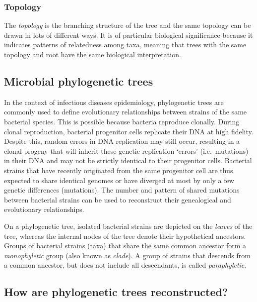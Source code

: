 \documentclass[11pt]{article}
\begin{document}
\hypertarget{topology}{%
\subsubsection{Topology}\label{topology}}

The \textit{topology} is the branching structure of the tree and the same
topology can be drawn in lots of different ways. It is of particular
biological significance because it indicates patterns of relatedness
among taxa, meaning that trees with the same topology and root have the
same biological interpretation.

    \hypertarget{microbial-phylogenetic-trees}{%
\subsection{Microbial phylogenetic
trees}\label{microbial-phylogenetic-trees}}

In the context of infectious diseases epidemiology, phylogenetic trees
are commonly used to define evolutionary relationships between strains
of the same bacterial species. This is possible because bacteria
reproduce clonally. During clonal reproduction, bacterial progenitor
cells replicate their DNA at high fidelity. Despite this, random errors
in DNA replication may still occur, resulting in a clonal progeny that
will inherit these genetic replication `errors' (i.e.~mutations) in
their DNA and may not be strictly identical to their progenitor cells.
Bacterial strains that have recently originated from the same progenitor
cell are thus expected to share identical genomes or have diverged at
most by only a few genetic differences (mutations). The number and
pattern of shared mutations between bacterial strains can be used to
reconstruct their genealogical and evolutionary relationships.

On a phylogenetic tree, isolated bacterial strains are depicted on the
\textit{leaves} of the tree, whereas the internal nodes of the tree denote
their hypothetical ancestors. Groups of bacterial strains (taxa) that
share the same common ancestor form a \textit{monophyletic} group (also
known as \textit{clade}). A group of strains that descends from a common
ancestor, but does not include all descendants, is called
\textit{paraphyletic}.

    \hypertarget{how-are-phylogenetic-trees-reconstructed}{%
\subsection{How are phylogenetic trees
reconstructed?}\label{how-are-phylogenetic-trees-reconstructed}}
\end{document}
